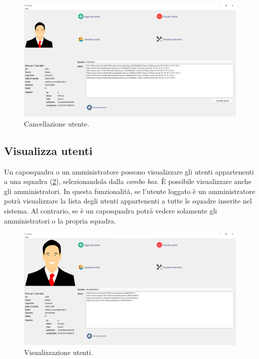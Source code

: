 \begin{figure}[h!]
	\centering
	\includegraphics[width=1\linewidth]{./ImageFiles/delete_user}
	\caption{Cancellazione utente.}
	\label{fig:delete_user}
\end{figure}

\subsection{Visualizza utenti}
Un caposquadra o un amministratore possono visualizzare gli utenti appartenenti a una squadra (\Fig\ref{fig:view_user}), selezionandola dalla \textit{combo box}. \`E possibile visualizzare anche gli amministratori. In questa funzionalità, se l'utente loggato è un amministratore potrà visualizzare la lista degli utenti appartenenti a tutte le squadre inserite nel sistema. Al contrario, se è un caposquadra potrà vedere solamente gli amministratori o la propria squadra.

\begin{figure}[h!]
	\centering
	\includegraphics[width=1\linewidth]{./ImageFiles/view_user}
	\caption{Visualizzazione utenti.}
	\label{fig:view_user}
\end{figure}

